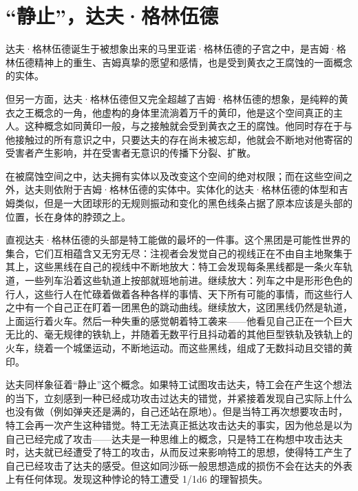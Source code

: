 \section{“静止”，达夫·格林伍德}

达夫·格林伍德诞生于被想象出来的马里亚诺·格林伍德的子宫之中，是吉姆·格林伍德精神上的重生、吉姆真挚的愿望和感情，也是受到黄衣之王腐蚀的一面概念的实体。

但另一方面，达夫·格林伍德但又完全超越了吉姆·格林伍德的想象，是纯粹的黄衣之王概念的一角，他虚构的身体里流淌着万千的黄印，他是这个空间真正的主人。这种概念如同黄印一般，与之接触就会受到黄衣之王的腐蚀。他同时存在于与他接触过的所有意识之中，只要达夫的存在尚未被忘却，他就会不断地对他寄宿的受害者产生影响，并在受害者无意识的传播下分裂、扩散。

在被腐蚀空间之中，达夫拥有实体以及改变这个空间的绝对权限；而在这些空间之外，达夫则依附于吉姆·格林伍德的实体中。实体化的达夫·格林伍德的体型和吉姆类似，但是一大团球形的无规则振动和变化的黑色线条占据了原本应该是头部的位置，长在身体的脖颈之上。

直视达夫·格林伍德的头部是特工能做的最坏的一件事。这个黑团是可能性世界的集合，它们互相蕴含又无穷无尽：注视者会发觉自己的视线正在不由自主地聚集于其上，这些黑线在自己的视线中不断地放大：特工会发现每条黑线都是一条火车轨道，一些列车沿着这些轨道上按部就班地前进。继续放大：列车之中是形形色色的行人，这些行人在忙碌着做着各种各样的事情、天下所有可能的事情，而这些行人之中有一个自己正在盯着一团黑色的跳动曲线。继续放大，这团黑线仍然是轨道，上面运行着火车。然后一种失重的感觉朝着特工袭来——他看见自己正在一个巨大无比的、毫无规律的铁轨上，并随着无数平行且抖动着的其他巨型铁轨及铁轨上的火车，绕着一个城堡运动，不断地运动。而这些黑线，组成了无数抖动且交错的黄印。

达夫同样象征着“静止”这个概念。如果特工试图攻击达夫，特工会在产生这个想法的当下，立刻感到一种已经成功攻击过达夫的错觉，并紧接着发现自己实际上什么也没有做（例如弹夹还是满的，自己还站在原地）。但是当特工再次想要攻击时，特工会再一次产生这种错觉。特工无法真正抵达攻击达夫的事实，因为他总是以为自己已经完成了攻击——达夫是一种思维上的概念，只是特工在构想中攻击达夫时，达夫就已经遭受了特工的攻击，从而反过来影响特工的思想，使得特工产生了自己已经攻击了达夫的感受。但这如同沙砾一般思想造成的损伤不会在达夫的外表上有任何体现。发现这种悖论的特工遭受 1/1d6 的理智损失。